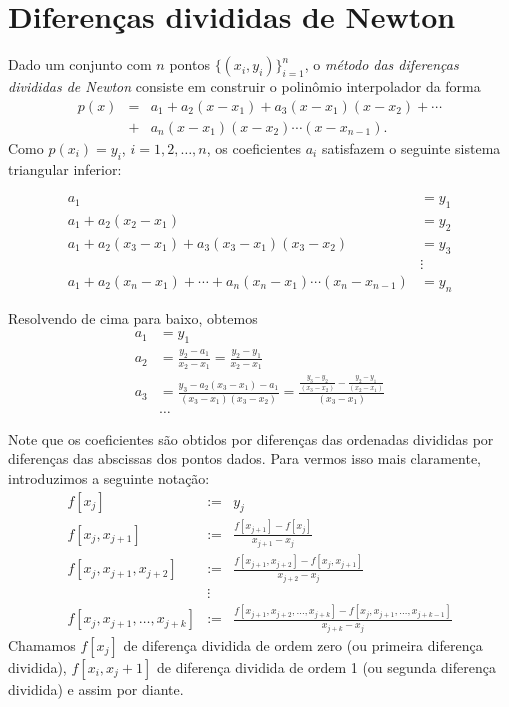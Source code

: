 \begin{resp}
\end{resp}


\section{Diferenças divididas de Newton}
Dado um conjunto com $n$ pontos $\{(x_i, y_i)\}_{i=1}^n$, o \emph{método das diferenças divididas de Newton} consiste em construir o polinômio interpolador da forma
\begin{eqnarray*}
p(x) &=& a_1 + a_2 (x-x_1) + a_3 (x-x_1)(x-x_2) + \cdots \\
     &+& a_n (x-x_1)(x-x_2)\cdots (x-x_{n-1}).
\end{eqnarray*}
Como $p(x_i) = y_i$, $i=1, 2, \dotsc, n$, os coeficientes $a_i$ satisfazem o seguinte sistema triangular inferior:
\begin{small}
  \begin{equation*}
    \begin{array}{ll}
a_1               &= y_1\\
a_1+a_2(x_2-x_1)  &= y_2\\
a_1+a_2(x_3-x_1)+a_3(x_3-x_1)(x_3-x_2) &= y_3\\
&\vdots\\
a_1+a_2(x_n-x_1)+\cdots + a_n(x_n-x_1)\cdots (x_n-x_{n-1}) &= y_n
    \end{array}
  \end{equation*}
\end{small}
Resolvendo de cima para baixo, obtemos
\begin{equation*}\label{eq:coef_dif_div}
  \begin{split}
a_1&=y_1\\
a_2&=\frac{y_2-a_1}{x_2-x_1}=\frac{y_2-y_1}{x_2-x_1}\\
a_3&=\frac{y_3-a_2(x_3-x_1)-a_1}{(x_3-x_1)(x_3-x_2)}=\frac{\frac{y_3-y_2}{(x_3-x_2)}-\frac{y_2-y_1}{(x_2-x_1)}}{(x_3-x_1)}\\
&\ldots    
  \end{split}
\end{equation*}

Note que os coeficientes são obtidos por diferenças das ordenadas divididas por diferenças das abscissas dos pontos dados. Para vermos isso mais claramente, introduzimos a seguinte notação:
\begin{eqnarray*}
f[x_j]&:=&y_j\\
f[x_j, x_{j+1}]&:=&\frac{f[x_{j+1}]-f[x_j]}{x_{j+1}-x_j}\\
f[x_j, x_{j+1}, x_{j+2}]&:=&\frac{f[x_{j+1}, x_{j+2}]-f[x_j, x_{j+1}]}{x_{j+2}-x_j}\\
&\vdots&\\
f[x_j, x_{j+1}, \dotsc, x_{j+k}] &:=& \frac{f[x_{j+1}, x_{j+2}, \dotsc, x_{j+k}]-f[x_j, x_{j+1}, \dotsc, x_{j+k-1}]}{x_{j+k}-x_j}
\end{eqnarray*}
Chamamos $f[x_j]$ de diferença dividida de ordem zero (ou primeira diferença dividida), $f[x_i,x_j+1]$ de diferença dividida de ordem 1 (ou segunda diferença dividida) e assim por diante.

